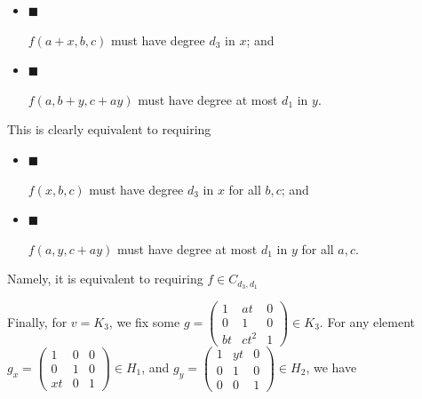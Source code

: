 \documentclass[10pt,a4paper]{article}
\begin{document}
\begin{itemize}


\item[] 
$\blacksquare$ 


$f(a+x,b,c)$ must have degree $d_{3}$ in $x$; and\par





\item[] 
$\blacksquare$ 


$f(a,b+y,c+ay)$ must have degree at most $d_{1}$ in $y$.\par





\end{itemize}


This is clearly equivalent to requiring\par


\begin{itemize}


\item[] 
$\blacksquare$ 


$f(x,b,c)$ must have degree $d_{3}$ in $x$ for all $b,c$; and\par





\item[] 
$\blacksquare$ 


$f(a,y,c+ay)$ must have degree at most $d_{1}$ in $y$ for all $a,c$.\par





\end{itemize}


Namely, it is equivalent to requiring $f\in C_{d_{3},d_{1}}$\par




Finally, for $v=K_{3}$, we
fix some $g=\begin{pmatrix}1&at&0\\
0&1&0\\
bt&ct^{2}&1\end{pmatrix}\in K_{3}$. For any element $g_{x}=\begin{pmatrix}1&0&0\\
0&1&0\\
xt&0&1\end{pmatrix}\in H_{1}$, and $g_{y}=\begin{pmatrix}1&yt&0\\
0&1&0\\
0&0&1\end{pmatrix}\in H_{2}$, we have\par
\end{document}
